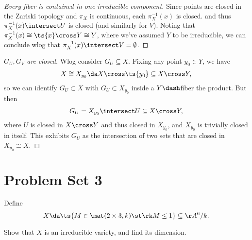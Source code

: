 \begin{solution}
\begin{proof}[Every fiber is contained in one irreducible component]
Since points are closed in the Zariski topology and \(\pi_X\) is
continuous, each \(\pi_X^{-1}(x)\) is closed. and thus
\(\pi_X^{-1}(x)\intersect U\) is closed (and similarly for \(V\)).
Noting that \(\pi_X^{-1}(x) \cong \ts{x}\cross Y \cong Y\), where we've
assumed \(Y\) to be irreducible, we can conclude wlog that
\(\pi_X^{-1}(x) \intersect V = \emptyset\).

\end{proof}

\begin{proof}[$G_U, G_V$ are closed]

Wlog consider \(G_U \subseteq X\). Fixing any point \(y_0 \in Y\), we
have
\begin{align*}X\cong X_{y_0} \da X\cross \ts{y_0} \subseteq X\cross Y,\end{align*}
so we can identify \(G_U \subset X\) with \(G_U\subset X_{y_0}\) inside
a \(Y\dash\)fiber the product. But then
\begin{align*}G_U = X_{y_0} \intersect U \subseteq X\cross Y,\end{align*}
where \(U\) is closed in \(X\cross Y\) and thus closed in \(X_{y_0}\),
and \(X_{y_0}\) is trivially closed in itself. This exhibits \(G_U\) as
the intersection of two sets that are closed in \(X_{y_0} \cong X\).

\end{proof}

\end{solution}

\hypertarget{problem-set-3}{%
\section{Problem Set 3}\label{problem-set-3}}

\begin{exercise}[Gathmann 2.33]

Define
\begin{align*}  
X \da \ts{M \in \mat(2\times 3, k) \st \rk M \leq 1} \subseteq \AA^6/k
.\end{align*}

Show that \(X\) is an irreducible variety, and find its dimension.

\end{exercise}

